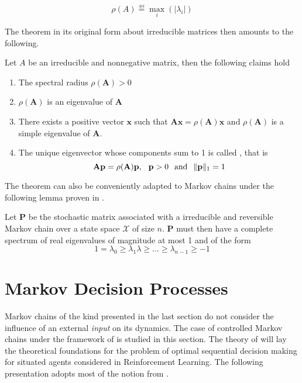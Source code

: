 \begin{equation}
\rho(A) \overset{\underset{\mathrm{def}}{}}{=} \max_i(|\lambda_i|)
\end{equation}

The theorem in its original form about irreducible matrices \cite{Horn1986} then amounts to the following.

\begin{thm}

Let $A$ be an irreducible and nonnegative matrix, then the following claims hold
\begin{enumerate}
\item The spectral radius $\rho(\mathbf{A})  > 0$
\item $\rho(\mathbf{A})$ is an eigenvalue of $\mathbf{A}$
\item There exists a positive vector $\mathbf{x}$ such that $\mathbf{A}\mathbf{x} = \rho(\mathbf{A})\mathbf{x}$ and $\rho(\mathbf{A})$ is a simple eigenvalue of $\mathbf{A}$.
\item The unique eigenvector whose components sum to 1 is called , that is
\begin{equation}
\mathbf{A} \mathbf{p} = \rho(\mathbf{A}) \mathbf{p}, \hspace{2.5mm} \mathbf{p} > 0 \hspace{2.5mm} \mbox{and} \hspace{2.5mm} \|\mathbf{p}\|_1 = 1
\end{equation}
\end{enumerate}
\end{thm}

The theorem can also be conveniently adapted to Markov chains under the following
lemma proven in \cite{Montenegro2006}.
\begin{lem}
Let $\mathbf{P}$ be the stochastic matrix associated with a irreducible and reversible 
Markov chain over a state space $\mathcal{X}$ of size $n$. $\mathbf{P}$ must then
have a complete spectrum of real eigenvalues of magnitude at most 1 and of the form
\begin{equation}
1 = \lambda_0 \geq \lambda_1 \lambda \geq \dots \geq \lambda_{n-1} \geq -1
\end{equation}
\end{lem}

\section{Markov Decision Processes}
\label{sec:mdp}
Markov chains of the kind presented in the last section do not consider the influence of an external \textit{input} on its dynamics. The case of controlled Markov chains under the framework of \mdps is studied in this section. The theory of \mdps will lay the theoretical foundations for the problem of optimal sequential decision making for situated agents considered in Reinforcement Learning. The following presentation adopts most of the notion from \cite{Csaba2010}. 

